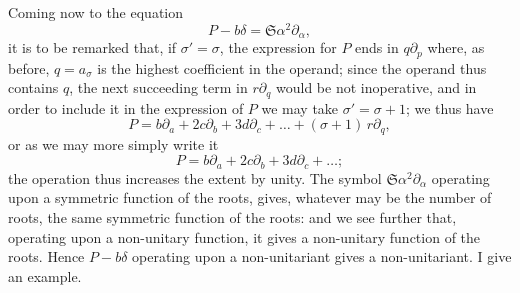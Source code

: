 \documentclass[11pt,a4paper]{book}
\begin{document}
\setcounter{art}{24}
\begin{art}
Coming now to the equation
\[
P - b\delta = \mathfrak{S}\alpha^{2}\partial_{\alpha},
\]
it is to be remarked that, if $\sigma' = \sigma$, the expression for $P$ ends in $q\partial_{p}$ where, as before, $q = a_{\sigma}$ is the highest coefficient in the operand; since the operand thus contains $q$, the next succeeding term in $r\partial_{q}$ would be not inoperative, and in order to include it in the expression of $P$ we may take $\sigma' = \sigma + 1$; we thus have
\[
P = b\partial_{a} + 2c\partial_{b} + 3d\partial_{c} + \ldots + (\sigma + 1)\,r\partial_{q},
\]
or as we may more simply write it
\[
P = b\partial_{a} + 2c\partial_{b} + 3d\partial_{c} + \ldots;
\]
the operation thus increases the extent by unity. The symbol $\mathfrak{S}\alpha^{2}\partial_{\alpha}$ operating upon a symmetric function of the roots, gives, whatever may be the number of roots, the same symmetric function of the roots: and we see further that, operating upon a non-unitary function, it gives a non-unitary function of the roots. Hence $P - b\delta$ operating upon a non-unitariant gives a non-unitariant. I give an example.
\end{art}
\end{document}
